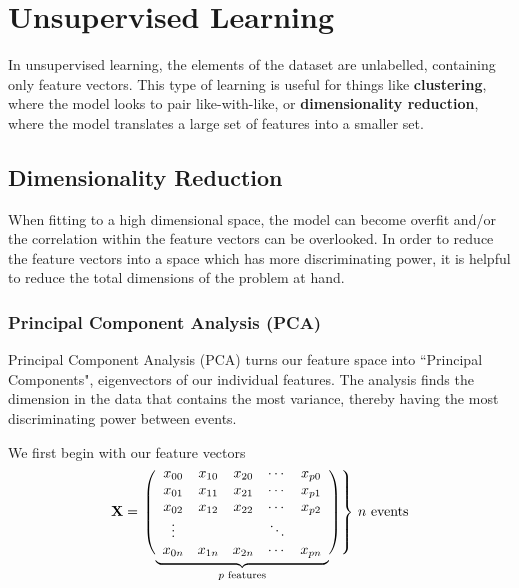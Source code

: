 \section{Unsupervised Learning}
In unsupervised learning, the elements of the dataset are unlabelled, containing only feature vectors. This type of learning is useful for things like \textbf{clustering}, where the model looks to pair like-with-like, or \textbf{dimensionality reduction}, where the model translates a large set of features into a smaller set.


\subsection{Dimensionality Reduction}\label{dim_red}
When fitting to a high dimensional space, the model can become overfit and/or the correlation within the feature vectors can be overlooked. In order to reduce the feature vectors into a space which has more discriminating power, it is helpful to reduce the total dimensions of the problem at hand.
\subsubsection{Principal Component Analysis (PCA)}
Principal Component Analysis (PCA) turns our feature space into ``Principal Components", eigenvectors of our individual features. The analysis finds the dimension in the data that contains the most variance, thereby having the most discriminating power between events.

We first begin with our feature vectors
$$\mathbf{X} = \left.\left( 
                  \vphantom{\begin{array}{c}1\\1\\1\\1\\1\end{array}}
                  \smash{\underbrace{
                      \begin{array}{ccccc}
                             x_{00}&x_{10}&x_{20}&\cdots &x_{p0}\\
                             x_{01}&x_{11}&x_{21}&\cdots &x_{p1}\\
                             x_{02}&x_{12}&x_{22}&\cdots &x_{p2}\\
                             \vdots&&&\ddots&\\
                             x_{0n}&x_{1n}&x_{2n}&\cdots &x_{pn}
                      \end{array}
                      }_{p\text{ features}}}
              \right)\right\}
              \,n\text{ events}
$$\\

